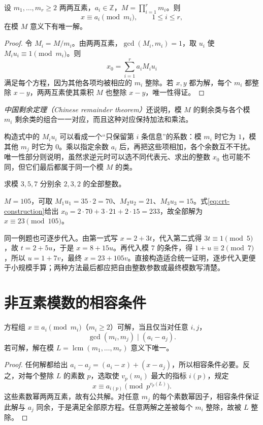 \begin{theorem}[中国剩余定理]
\label{thm:crt}
设 $m_1,\ldots,m_r\ge2$ 两两互素，$a_i\in\mathbb Z$，$M=\prod_{i=1}^r m_i$。则
\begin{equation}
 x\equiv a_i\pmod{m_i},\qquad 1\le i\le r,
 \label{eq:crt-system}
\end{equation}
在模 $M$ 意义下有唯一解。
\end{theorem}
\begin{proof}
令 $M_i=M/m_i$。由两两互素，$\gcd(M_i,m_i)=1$，取 $u_i$ 使 $M_iu_i\equiv1\pmod{m_i}$。则
\begin{equation}
 x_0=\sum_{i=1}^r a_iM_iu_i
 \label{eq:crt-construction}
\end{equation}
满足每个方程，因为其他各项均被相应的 $m_i$ 整除。若 $x,y$ 都为解，每个 $m_i$ 都整除 $x-y$，两两互素使其乘积 $M$ 也整除 $x-y$，唯一性得证。
\end{proof}

\emph{中国剩余定理（Chinese remainder theorem）}还说明，模 $M$ 的剩余类与各个模 $m_i$ 剩余类的组合一一对应，而且这种对应保持加法和乘法。

构造式中的 $M_iu_i$ 可以看成一个“只保留第 $i$ 条信息”的系数：模 $m_i$ 时它为 $1$，模其他 $m_j$ 时它为 $0$。乘以指定余数 $a_i$ 后，再把这些项相加，各个余数互不干扰。唯一性部分则说明，虽然求逆元时可以选不同代表元、求出的整数 $x_0$ 也可能不同，但它们最后都属于同一个模 $M$ 的类。

\begin{example}
求模 $3,5,7$ 分别余 $2,3,2$ 的全部整数。
\end{example}
\begin{solve}
$M=105$，可取 $M_1u_1=35\cdot2=70$、$M_2u_2=21$、$M_3u_3=15$。式\eqref{eq:crt-construction}给出 $x_0=2\cdot70+3\cdot21+2\cdot15=233$，故全部解为 $x\equiv23\pmod{105}$。
\end{solve}

同一例题也可逐步代入。由第一式写 $x=2+3t$，代入第二式得 $3t\equiv1\pmod5$，故 $t=2+5u$，于是 $x=8+15u$。再代入模 $7$ 的条件，得 $1+u\equiv2\pmod7$，所以 $u=1+7v$，最终 $x=23+105v$。直接构造适合统一证明，逐步代入更便于小规模手算；两种方法最后都应把自由整数参数或最终模数写清楚。

\section{非互素模数的相容条件}

\begin{theorem}
\label{thm:general-crt}
方程组 $x\equiv a_i\pmod{m_i}$（$m_i\ge2$）可解，当且仅当对任意 $i,j$，
\[
 \gcd(m_i,m_j)\mid(a_i-a_j).
\]
若可解，解在模 $L=\operatorname{lcm}(m_1,\ldots,m_r)$ 意义下唯一。
\end{theorem}
\begin{proof}
任何解都给出 $a_i-a_j=(a_i-x)+(x-a_j)$，所以相容条件必要。反之，对每个整除 $L$ 的素数 $p$，选取使 $v_p(m_i)$ 最大的指标 $i(p)$，规定
\[
 x\equiv a_{i(p)}\pmod{p^{v_p(L)}}.
\]
这些素数幂两两互素，故有公共解。对任意 $m_j$ 的每个素数幂因子，相容条件保证此解与 $a_j$ 同余，于是满足全部原方程。任意两解之差被每个 $m_i$ 整除，故被 $L$ 整除。
\end{proof}

